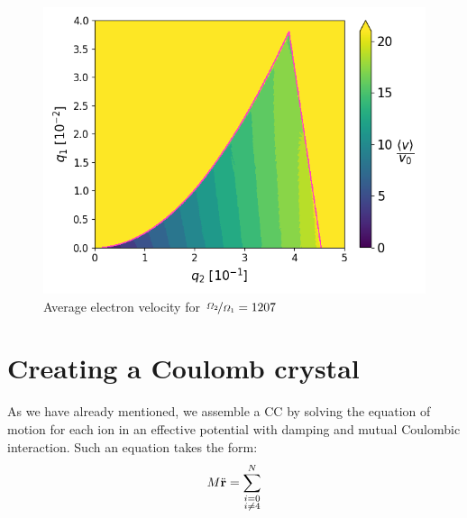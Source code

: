 \begin{figure}[H]
	\centering
	\includegraphics[width=\linewidth]{img/0_ions_1_electrons_q1_0.0-0.04_q2_0.0-0.5_960x960_1207_1000.png}
	\caption{Average electron velocity for $\nicefrac{\Omega_2}{\Omega_1} = 1207$}
	\label{fig:vel-eta=1207}
\end{figure}

\section{Creating a Coulomb crystal}
As we have already mentioned, we assemble a CC by solving the equation of motion for each ion in an effective potential with damping and mutual Coulombic interaction. Such an equation takes the form:
\begin{equation}
	\label{eomCC}
	M\ddot{\vb{r}} = \sum\limits_{\substack{i=0 \\ i\neq 4}}^{N}
\end{equation}


